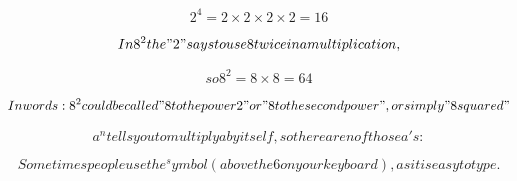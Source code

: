 






\[2^{4} = 2 \times 2 \times 2 \times 2 = 16\]

\[In 8^{2} the "2" says to use 8 twice in a multiplication,\]

\[so 8^{2} = 8 \times 8 = 64\]

\[In words: 8^{2} could be called "8 to the power 2" or "8 to the second power", or simply "8 squared"\]

\[a^{n} tells you to multiply a by itself,so there are n of those a's:\]

\[Sometimes people use the ^ symbol (above the 6 on your keyboard), as it is easy to type.\]
